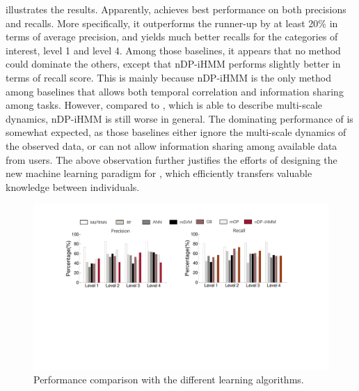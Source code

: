 \begin{itemize}



\end{itemize}

 illustrates the results. Apparently, \modelname achieves best performance on both precisions and recalls.
More specifically, it outperforms the runner-up by at least 20\% in terms of average precision, and yields much better recalls for the categories of interest, \ie level 1 and level 4.
Among those baselines, it appears that no method could dominate the others, except that nDP-iHMM performs slightly better in terms of recall score.
This is mainly because nDP-iHMM is the only method among baselines that allows both temporal correlation and information sharing among tasks.
However, compared to \modelname, which is able to describe multi-scale dynamics, nDP-iHMM is still worse in general.
The dominating performance of \modelname is somewhat expected, as those baselines either ignore the multi-scale dynamics of the observed data, or can not allow information sharing among available data from users.
The above observation further justifies the efforts of designing the new machine learning paradigm for \sysname, which efficiently transfers valuable knowledge between individuals.
\begin{figure}[h]
  \centering
  \includegraphics[width=0.9\columnwidth]{./img/Model_CMP1.pdf}
  \caption{Performance comparison with the different learning algorithms.}
  \label{fig:cmp_models}
\end{figure}




